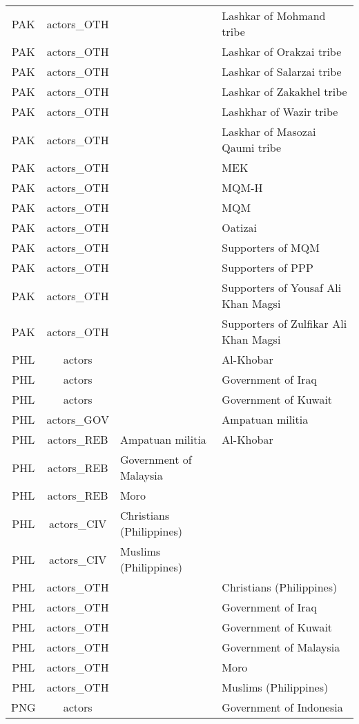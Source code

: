\documentclass[12pt]{article}
\begin{document}
\begin{center}
\begin{longtable}{|c|c|p{7cm}|p{7cm}|}
  PAK & actors\_OTH &  & Lashkar of Mohmand tribe \\ 
  PAK & actors\_OTH &  & Lashkar of Orakzai tribe \\ 
  PAK & actors\_OTH &  & Lashkar of Salarzai tribe \\ 
  PAK & actors\_OTH &  & Lashkar of Zakakhel tribe \\ 
  PAK & actors\_OTH &  & Lashkhar of Wazir tribe \\ 
  PAK & actors\_OTH &  & Laskhar of Masozai Qaumi tribe \\ 
  PAK & actors\_OTH &  & MEK \\ 
  PAK & actors\_OTH &  & MQM-H \\ 
  PAK & actors\_OTH &  & MQM \\ 
  PAK & actors\_OTH &  & Oatizai \\ 
  PAK & actors\_OTH &  & Supporters of MQM \\ 
  PAK & actors\_OTH &  & Supporters of PPP \\ 
  PAK & actors\_OTH &  & Supporters of Yousaf Ali Khan Magsi \\ 
  PAK & actors\_OTH &  & Supporters of Zulfikar Ali Khan Magsi \\ 
  PHL & actors &  & Al-Khobar \\ 
  PHL & actors &  & Government of Iraq \\ 
  PHL & actors &  & Government of Kuwait \\ 
  PHL & actors\_GOV &  & Ampatuan militia \\ 
  PHL & actors\_REB & Ampatuan militia & Al-Khobar \\ 
  PHL & actors\_REB & Government of Malaysia &  \\ 
  PHL & actors\_REB & Moro &  \\ 
  PHL & actors\_CIV & Christians (Philippines) &  \\ 
  PHL & actors\_CIV & Muslims (Philippines) &  \\ 
  PHL & actors\_OTH &  & Christians (Philippines) \\ 
  PHL & actors\_OTH &  & Government of Iraq \\ 
  PHL & actors\_OTH &  & Government of Kuwait \\ 
  PHL & actors\_OTH &  & Government of Malaysia \\ 
  PHL & actors\_OTH &  & Moro \\ 
  PHL & actors\_OTH &  & Muslims (Philippines) \\ 
  PNG & actors &  & Government of Indonesia \\ 

\end{longtable}
\end{center}
\end{document}
